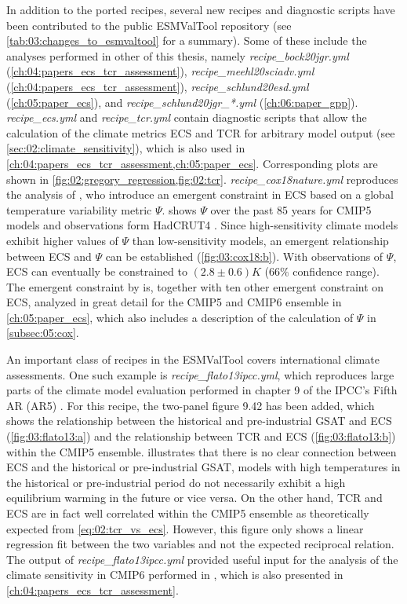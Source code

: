 In addition to the ported recipes, several new recipes and diagnostic scripts
have been contributed to the public \ac{ESMValTool} repository (see
\cref{tab:03:changes_to_esmvaltool} for a summary). Some of these include the
analyses performed in other  of this
thesis, namely \emph{recipe\_bock20jgr.yml}
(\cref{ch:04:papers_ecs_tcr_assessment}), \emph{recipe\_meehl20sciadv.yml}
(\cref{ch:04:papers_ecs_tcr_assessment}), \emph{recipe\_schlund20esd.yml}
(\cref{ch:05:paper_ecs}), and \emph{recipe\_schlund20jgr\_*.yml}
(\cref{ch:06:paper_gpp}). \emph{recipe\_ecs.yml} and \emph{recipe\_tcr.yml}
contain diagnostic scripts that allow the calculation of the climate metrics
\ac{ECS} and \ac{TCR} for arbitrary model output (see
\cref{sec:02:climate_sensitivity}), which is also used in
\cref{ch:04:papers_ecs_tcr_assessment,ch:05:paper_ecs}. Corresponding plots are
shown in \cref{fig:02:gregory_regression,fig:02:tcr}.
\emph{recipe\_cox18nature.yml} reproduces the analysis of \textcite{Cox2018},
who introduce an emergent constraint in \ac{ECS} based on a global temperature
variability metric $\Psi$.  shows $\Psi$ over the past 85
years for \acs{CMIP}5 models and observations form HadCRUT4
\autocite{Morice2012}. Since high-sensitivity climate models exhibit higher
values of $\Psi$ than low-sensitivity models, an emergent relationship between
\ac{ECS} and $\Psi$ can be established (\cref{fig:03:cox18:b}). With
observations of $\Psi$, \ac{ECS} can eventually be constrained to $\left( 2.8
\pm 0.6 \right) \unit{K}$ ($66 \unit{\%}$ confidence range). The emergent
constraint by \textcite{Cox2018} is, together with ten other emergent
constraint on \ac{ECS}, analyzed in great detail for the \acs{CMIP}5 and
\acs{CMIP}6 ensemble in \cref{ch:05:paper_ecs}, which also includes a
description of the calculation of $\Psi$ in \cref{subsec:05:cox}.

An important class of recipes in the \ac{ESMValTool} covers international
climate assessments. One such example is \emph{recipe\_flato13ipcc.yml}, which
reproduces large parts of the climate model evaluation performed in chapter 9
of the \ac{IPCC}'s Fifth \acl{AR} (\acs{AR}5) \autocite{Flato2013}. For this
recipe, the two-panel figure 9.42 has been added, which shows the relationship
between the historical and pre-industrial \ac{GSAT} and \ac{ECS}
(\cref{fig:03:flato13:a}) and the relationship between \ac{TCR} and \ac{ECS}
(\cref{fig:03:flato13:b}) within the \acs{CMIP}5 ensemble.
 illustrates that there is no clear connection between
\ac{ECS} and the historical or pre-industrial \ac{GSAT}, \ie{} models with high
temperatures in the historical or pre-industrial period do not necessarily
exhibit a high equilibrium warming in the future or vice versa. On the other
hand, \ac{TCR} and \ac{ECS} are in fact well correlated within the \acs{CMIP}5
ensemble as theoretically expected from \cref{eq:02:tcr_vs_ecs}. However, this
figure only shows a linear regression fit between the two variables and not the
expected reciprocal relation. The output of \emph{recipe\_flato13ipcc.yml}
provided useful input for the analysis of the climate sensitivity in
\acs{CMIP}6 performed in \textcite{Meehl2020}, which is also presented in
\cref{ch:04:papers_ecs_tcr_assessment}.

